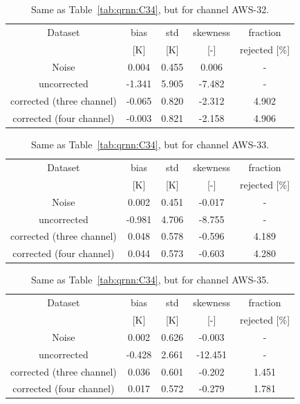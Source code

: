 \documentclass[12pt]{article}
\begin{document}
\begin{table}[!tb]
	\centering
	\begin{tabular}[b]{c|c|c|c|c}
	Dataset  		  &   bias &   std &   skewness & fraction  \\
	&   [K]  &   [K] & [-] & rejected [\%]\\
		\hline
Noise                     &  0.004 & 0.455 &              0.006 &      - \\
uncorrected               & -1.341 & 5.905 &             -7.482 &      - \\
corrected (three channel) & -0.065 & 0.820 &             -2.312 &      4.902 \\
corrected (four channel)  & -0.003 & 0.821 &             -2.158 &      4.906 \\
		\hline
	\end{tabular}
	\caption{ Same as Table~\ref{tab:qrnn:C34}, but for channel AWS-32.}
	\label{tab:qrnn:C32}
\end{table}


\begin{table}[!tb]
	\centering
	\begin{tabular}[b]{c|c|c|c|c}
	Dataset  		  &   bias &   std &   skewness & fraction  \\
	&   [K]  &   [K] & [-] & rejected [\%]\\
		\hline
Noise                     &  0.002 & 0.451 &             -0.017 &     - \\
uncorrected               & -0.981 & 4.706 &             -8.755 &     - \\
corrected (three channel) &  0.048 & 0.578 &             -0.596 &      4.189 \\
corrected (four channel)  &  0.044 & 0.573 &             -0.603 &      4.280 \\
		\hline
	\end{tabular}
	\caption{ Same as Table~\ref{tab:qrnn:C34}, but for channel AWS-33.}
	\label{tab:qrnn:C33}
\end{table}

\begin{table}[!tb]
	\centering
	\begin{tabular}[b]{c|c|c|c|c}
	Dataset  		  &   bias &   std &   skewness & fraction  \\
	&   [K]  &   [K] & [-] & rejected [\%]\\
		\hline
Noise                      &  0.002 & 0.626 &             -0.003 &      - \\
uncorrected                & -0.428 & 2.661 &            -12.451 &      - \\
corrected (three channel)  &  0.036 & 0.601 &             -0.202 &      1.451 \\
corrected (four channel)   &  0.017 & 0.572 &             -0.279 &      1.781 \\
		\hline
	\end{tabular}
	\caption{ Same as Table~\ref{tab:qrnn:C34}, but for channel AWS-35.}
	\label{tab:qrnn:C35}
\end{table}
\end{document}
